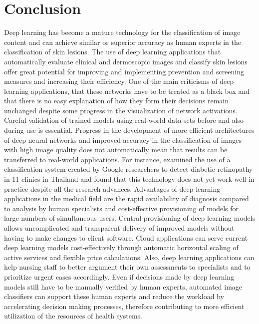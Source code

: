 \documentclass[journal]{IEEEtran}
\begin{document}
\section{Conclusion}
Deep learning has become a mature technology for the classification of image content and can achieve similar or superior accuracy as human experts in the classification of skin lesions. The use of deep learning applications that automatically evaluate clinical and dermoscopic images and classify skin lesions offer great potential for improving and implementing prevention and screening measures and increasing their efficiency.
One of the main criticisms of deep learning applications, that these networks have to be treated as a black box and that there is no easy explanation of how they form their decisions remain unchanged despite some progress in the visualization of network activations. Careful validation of trained models using real-world data sets before and also during use is essential.
Progress in the development of more efficient architectures of deep neural networks and improved accuracy in the classification of images with high image quality does not automatically mean that results can be transferred to real-world applications. For instance, \cite{beede2020human} examined the use of a classification system created by Google researchers to detect diabetic retinopathy in 11 clinics in Thailand and found that this technology does not yet work well in practice despite all the research advances.
Advantages of deep learning applications in the medical field are the rapid availability of diagnosis compared to analysis by human specialists and cost-effective provisioning of models for large numbers of simultaneous users. Central provisioning of deep learning models allows uncomplicated and transparent delivery of improved models without having to make changes to client software. Cloud applications can serve current deep learning models cost-effectively through automatic horizontal scaling of active services and flexible price calculations. Also, deep learning applications can help nursing staff to better argument their own assessments to specialists and to prioritize urgent cases accordingly. Even if decisions made by deep learning models still have to be manually verified by human experts, automated image classifiers can support these human experts and reduce the workload by accelerating decision making processes, therefore contributing to more efficient utilization of the resources of health systems.




















\ifCLASSOPTIONcaptionsoff
  \newpage
\fi










\nocite{*}

\end{document}
